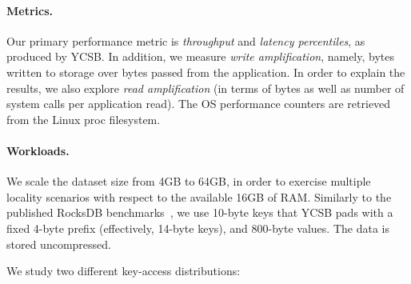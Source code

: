 \paragraph{Metrics.} Our primary performance metric is \emph{throughput} 
and \emph{latency percentiles}, as produced by YCSB. 
In addition, we measure \emph{write amplification}, namely, bytes written to storage over bytes passed from the application. 
In order to explain the results, we also explore \emph{read amplification} (in terms of bytes as well as number of system calls per application read).  
The OS performance counters are retrieved from the Linux proc filesystem. 

\paragraph{Workloads.} 
We scale the dataset size from 4GB to 64GB, in order to exercise multiple locality 
scenarios with respect to the available 16GB of RAM. Similarly to the published RocksDB benchmarks~\cite{RocksDBPerf}, we use 
10-byte keys that YCSB pads with a fixed 4-byte prefix (effectively, 14-byte keys), and 800-byte values. 
The data is stored uncompressed. 

We study two different key-access distributions:  

